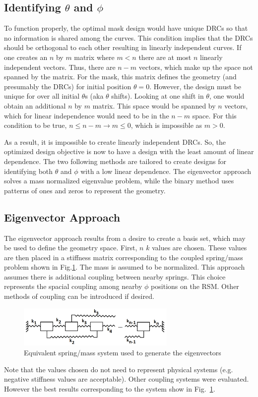 \documentclass[3p,times]{elsarticle}
\begin{document}
\subsection{Identifying $\theta$ and $\phi$}
To function properly, the optimal mask design would have unique DRCs so that no information is shared among the curves.  This condition implies that the DRCs should be orthogonal to each other
resulting in linearly independent curves.  If one creates an $n$ by $m$ matrix where $m<n$ there are at most $n$ linearly independent vectors.  Thus, there are $n-m$ vectors, which 
make up the space not spanned by the matrix.  For the mask, this matrix defines the geometry (and presumably the DRCs) for initial position $\theta=0$.  However, the design must be unique for 
over all initial $\theta$s (aka $\theta$ shifts).  Looking at one shift in $\theta$, one would obtain an additional $n$ by $m$ matrix.  This space would be spanned by $n$ vectors, which for linear independence would
need to be in the $n-m$ space.  For this condition to be true, $n\leq n-m\rightarrow m\leq 0$, which is impossible as $m>0$.

As a result, it is impossible to create linearly independent DRCs.  So, the optimized design objective is now to have a design with the least amount of linear dependence.  The two following methods 
are tailored to create designs for identifying both $\theta$ and $\phi$ with a low linear dependence.  The eigenvector approach solves a mass normalized eigenvalue problem, while the binary method uses 
patterns of ones and zeros to represent the geometry.

\subsection{Eigenvector Approach}
The eigenvector approach results from a desire to create a basis set, which may be used to define the geometry space.  First, $n$ $k$ values are chosen.  These values are then placed in a stiffness
matrix corresponding to the coupled spring/mass problem shown in Fig.\ref{fig:stiff}.  The mass is assumed to be normalized.  This approach assumes there is additional coupling between nearby springs.  
This choice represents the spacial coupling among nearby $\phi$ positions on the RSM.
Other methods of coupling can be introduced if desired.
\begin{figure}[ht!]
\includegraphics[width={3.0in}]{../figs/MassSys.pdf}
\centering
\caption{Equivalent spring/mass system used to generate the eigenvectors}
\label{fig:stiff}
\end{figure}
Note that the values chosen do not need to represent physical systems (e.g. negative stiffness values are acceptable).  
Other coupling systems were evaluated.  However the best results corresponding to the system show in Fig.~\ref{fig:stiff}.  
\end{document}
